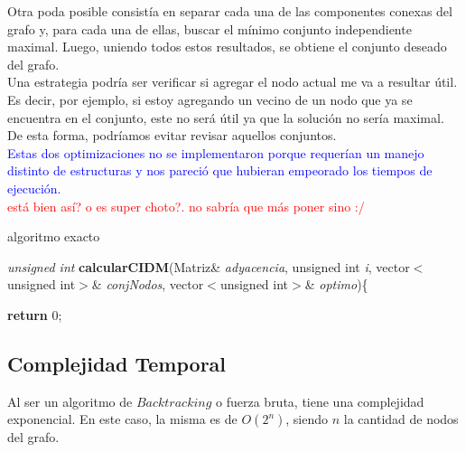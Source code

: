 Otra poda posible consist\'ia en separar cada una de las componentes conexas del grafo y, para cada una de ellas, buscar el m\'inimo conjunto independiente maximal.
Luego, uniendo todos estos resultados, se obtiene el conjunto deseado del grafo.\\

Una estrategia podr\'ia ser verificar si agregar el nodo actual me va a resultar \'util. Es decir, por ejemplo, si estoy agregando un vecino de un nodo que ya se encuentra en el conjunto, este no ser\'a \'util ya que
la soluci\'on no ser\'ia maximal. De esta forma, podr\'iamos evitar revisar aquellos conjuntos.\\

\textcolor{blue}{Estas dos optimizaciones no se implementaron porque requer\'ian un manejo distinto de estructuras y nos pareci\'o que hubieran empeorado los tiempos de ejecuci\'on.}\\
\textcolor{red}{est\'a bien as\'i? o es super choto?. no sabr\'ia que m\'as poner sino :/}

\newpage
\begin{algorithm}[h!]
\caption{algoritmo exacto}

\textit{unsigned int} \textbf{calcularCIDM}(Matriz\& \textit{adyacencia}, unsigned int \textit{i}, vector$<$unsigned int$>$\& \textit{conjNodos}, vector$<$unsigned int$>$\& \textit{optimo})\{ 
\newline

\textbf{return} 0;
\end{algorithm}

\subsection{Complejidad Temporal}
Al ser un algoritmo de $Backtracking$ o fuerza bruta, tiene una complejidad exponencial. En este caso, la misma es de $O(2^n)$, siendo $n$ la cantidad de nodos del grafo. \\


